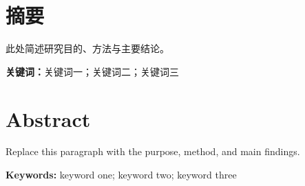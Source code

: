 \chapter*{摘要}
此处简述研究目的、方法与主要结论。

\par\noindent\textbf{关键词：}关键词一；关键词二；关键词三

\chapter*{Abstract}
Replace this paragraph with the purpose, method, and main findings.

\par\noindent\textbf{Keywords:} keyword one; keyword two; keyword three
